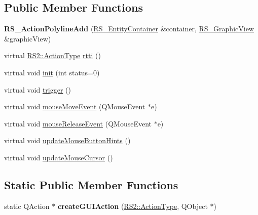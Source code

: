 \subsection*{Public Member Functions}
\begin{DoxyCompactItemize}
\item 
\hypertarget{classRS__ActionPolylineAdd_a326e01e6fc12acfdfc82e3baea5392b5}{{\bfseries R\-S\-\_\-\-Action\-Polyline\-Add} (\hyperlink{classRS__EntityContainer}{R\-S\-\_\-\-Entity\-Container} \&container, \hyperlink{classRS__GraphicView}{R\-S\-\_\-\-Graphic\-View} \&graphic\-View)}\label{classRS__ActionPolylineAdd_a326e01e6fc12acfdfc82e3baea5392b5}

\item 
virtual \hyperlink{classRS2_afe3523e0bc41fd637b892321cfc4b9d7}{R\-S2\-::\-Action\-Type} \hyperlink{classRS__ActionPolylineAdd_af8c5dbeb8cb72e6a0001eee45c9fde39}{rtti} ()
\item 
virtual void \hyperlink{classRS__ActionPolylineAdd_aaa7f71125d9a07ce8e892d6db3112831}{init} (int status=0)
\item 
virtual void \hyperlink{classRS__ActionPolylineAdd_af820ce62ec3a089dd6f73bd6d509606a}{trigger} ()
\item 
virtual void \hyperlink{classRS__ActionPolylineAdd_a50367b82426d333bea4b1826be2e0e78}{mouse\-Move\-Event} (Q\-Mouse\-Event $\ast$e)
\item 
virtual void \hyperlink{classRS__ActionPolylineAdd_a10f27e7e50bb2c202b22680ddb97d44a}{mouse\-Release\-Event} (Q\-Mouse\-Event $\ast$e)
\item 
virtual void \hyperlink{classRS__ActionPolylineAdd_af167a2c1bb890428fba754341c6460a6}{update\-Mouse\-Button\-Hints} ()
\item 
virtual void \hyperlink{classRS__ActionPolylineAdd_a92fc11c041a6ae5070dd1e0bda635634}{update\-Mouse\-Cursor} ()
\end{DoxyCompactItemize}
\subsection*{Static Public Member Functions}
\begin{DoxyCompactItemize}
\item 
\hypertarget{classRS__ActionPolylineAdd_af453830d79b68e3e69fd73353e864f1f}{static Q\-Action $\ast$ {\bfseries create\-G\-U\-I\-Action} (\hyperlink{classRS2_afe3523e0bc41fd637b892321cfc4b9d7}{R\-S2\-::\-Action\-Type}, Q\-Object $\ast$)}\label{classRS__ActionPolylineAdd_af453830d79b68e3e69fd73353e864f1f}

\end{DoxyCompactItemize}

